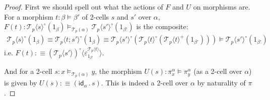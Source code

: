 \documentclass[10pt]{article}
\theoremstyle{definition}
\newcommand\TrPlus[2]{\ensuremath{{#1}^+(#2)}}
\newcommand\TrCirc[2]{\ensuremath{{#1}^\circ(#2)}}
\newcommand{\id}{\mathsf{id}}
\newcommand\El[2]{\mathcal{T}_{#1}(#2)}
\newcommand\ApEl[2]{\mathcal{T}_{#1}\langle#2\rangle}
\newcommand\ap[2]{\ensuremath{#1 \langle #2 \rangle }}
\newcommand\bdot[0]{\mathbin{.}}
\begin{document}
\begin{proof}
First we should spell out what the actions of $F$ and $U$ on morphisms are. For a morphism $t : \beta \vDash \beta'$ of 2-cells $s$ and $s'$ over $\alpha$, $F(t) : \TrCirc{\ApEl{p}{s}}{1_\beta} \vDash_{\El{p}{\alpha}} \TrCirc{\ApEl{p}{s'}}{1_{\beta'}}$ is the composite:
\begin{align*}
\TrCirc{\ApEl{p}{s}}{1_\beta} \equiv \TrCirc{\ApEl{p}{t;s'}}{1_\beta} \equiv \TrCirc{\ApEl{p}{s'}}{\TrCirc{\ApEl{p}{t}}{\TrPlus{\ApEl{p}{t}}{1_{\beta'}}}} \vDash \TrCirc{\ApEl{p}{s'}}{1_{\beta'}}
\end{align*}
i.e. $F(t) :\equiv \ap{(\ApEl{p}{s'})^\circ}{\varepsilon^{\ApEl{p}{t}}_{1_{\beta'}}}$.

And for a 2-cell $s : x \vDash_{\El{p}{\alpha}} y$, the morphism $U(s) : \pi^\alpha_x \vDash \pi^\alpha_y$ (as a 2-cell over $\alpha$) is given by $U(s) :\equiv (\id_\alpha \bdot s)$. This is indeed a 2-cell over $\alpha$ by naturality of $\pi$.


\end{proof}
\end{document}
